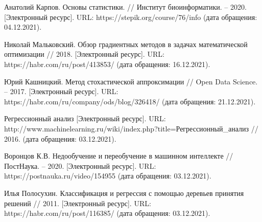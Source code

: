 \begin{thebibliography}{00}
     Анатолий Карпов. Основы статистики. // Институт биоинформатики. -- 2020. [Электронный ресурс]. URL: https://stepik.org/course/76/info (дата обращения: 04.12.2021).
        
     Николай Мальковский. Обзор градиентных методов в задачах математической оптимизации // 2018. [Электронный ресурс]. URL: https://habr.com/ru/post/413853/ (дата обращения: 16.12.2021).
    
     Юрий Кашницкий. Метод стохастической аппроксимации // Open Data Science. -- 2017. [Электронный ресурс]. URL: https://habr.com/ru/company/ods/blog/326418/ (дата обращения: 21.12.2021).
    
     Регрессионный анализ [Электронный ресурс]. URL: http://www.machinelearning.ru/wiki/index.php?title=Регрессионный\_анализ // 2016. (дата обращения: 03.12.2021).
    
     Воронцов К.В. Недообучение и переобучение в машинном интеллекте // ПостНаука. -- 2020. [Электронный ресурс]. URL: https://postnauka.ru/video/154955 (дата обращения: 03.12.2021).
    
     Илья Полосухин. Классификация и регрессия с помощью деревьев принятия решений // 2011. [Электронный ресурс]. URL: https://habr.com/ru/post/116385/ (дата обращения: 03.12.2021).
    
\end{thebibliography}
